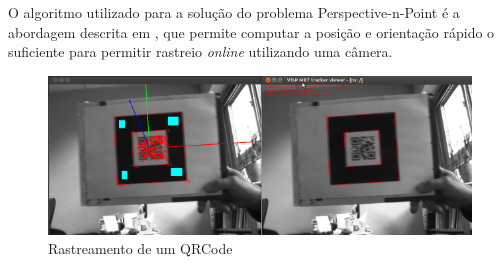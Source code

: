 O algoritmo utilizado para a solução do problema Perspective-n-Point é a abordagem descrita em \citep{dementhon1995model,oberkampf1996iterative}, que permite computar a posição e orientação rápido o suficiente para permitir rastreio \textit{online} utilizando uma câmera.

\begin{figure}[!ht]
\centering
  \includegraphics[width=\linewidth]{./img/tracker_viewer-small.png}
  \caption{Rastreamento de um QRCode}
  \label{fig:cenpes_doris}
\end{figure}%


